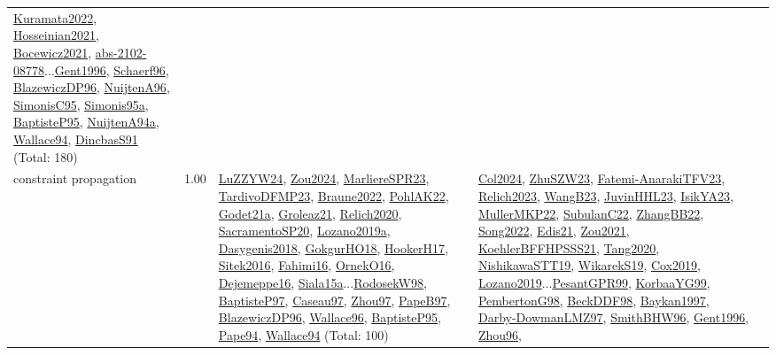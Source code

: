 {\begin{longtable}{p{3cm}r>{\raggedright\arraybackslash}p{6cm}>{\raggedright\arraybackslash}p{6cm}>{\raggedright\arraybackslash}p{8cm}}
\hyperref[detail:Kuramata2022]{Kuramata2022}, \hyperref[detail:Hosseinian2021]{Hosseinian2021}, \hyperref[detail:Bocewicz2021]{Bocewicz2021}, \hyperref[detail:abs-2102-08778]{abs-2102-08778}...\hyperref[detail:Gent1996]{Gent1996}, \hyperref[detail:Schaerf96]{Schaerf96}, \hyperref[detail:BlazewiczDP96]{BlazewiczDP96}, \hyperref[detail:NuijtenA96]{NuijtenA96}, \hyperref[detail:SimonisC95]{SimonisC95}, \hyperref[detail:Simonis95a]{Simonis95a}, \hyperref[detail:BaptisteP95]{BaptisteP95}, \hyperref[detail:NuijtenA94a]{NuijtenA94a}, \hyperref[detail:Wallace94]{Wallace94}, \hyperref[detail:DincbasS91]{DincbasS91} (Total: 180)\\
\index{constraint propagation}\index{CP!constraint propagation}constraint propagation &  1.00 & \hyperref[detail:LuZZYW24]{LuZZYW24}, \hyperref[detail:Zou2024]{Zou2024}, \hyperref[detail:MarliereSPR23]{MarliereSPR23}, \hyperref[detail:TardivoDFMP23]{TardivoDFMP23}, \hyperref[detail:Braune2022]{Braune2022}, \hyperref[detail:PohlAK22]{PohlAK22}, \hyperref[detail:Godet21a]{Godet21a}, \hyperref[detail:Groleaz21]{Groleaz21}, \hyperref[detail:Relich2020]{Relich2020}, \hyperref[detail:SacramentoSP20]{SacramentoSP20}, \hyperref[detail:Lozano2019a]{Lozano2019a}, \hyperref[detail:Dasygenis2018]{Dasygenis2018}, \hyperref[detail:GokgurHO18]{GokgurHO18}, \hyperref[detail:HookerH17]{HookerH17}, \hyperref[detail:Sitek2016]{Sitek2016}, \hyperref[detail:Fahimi16]{Fahimi16}, \hyperref[detail:OrnekO16]{OrnekO16}, \hyperref[detail:Dejemeppe16]{Dejemeppe16}, \hyperref[detail:Siala15a]{Siala15a}...\hyperref[detail:RodosekW98]{RodosekW98}, \hyperref[detail:BaptisteP97]{BaptisteP97}, \hyperref[detail:Caseau97]{Caseau97}, \hyperref[detail:Zhou97]{Zhou97}, \hyperref[detail:PapeB97]{PapeB97}, \hyperref[detail:BlazewiczDP96]{BlazewiczDP96}, \hyperref[detail:Wallace96]{Wallace96}, \hyperref[detail:BaptisteP95]{BaptisteP95}, \hyperref[detail:Pape94]{Pape94}, \hyperref[detail:Wallace94]{Wallace94} (Total: 100) & \hyperref[detail:Col2024]{Col2024}, \hyperref[detail:ZhuSZW23]{ZhuSZW23}, \hyperref[detail:Fatemi-AnarakiTFV23]{Fatemi-AnarakiTFV23}, \hyperref[detail:Relich2023]{Relich2023}, \hyperref[detail:WangB23]{WangB23}, \hyperref[detail:JuvinHHL23]{JuvinHHL23}, \hyperref[detail:IsikYA23]{IsikYA23}, \hyperref[detail:MullerMKP22]{MullerMKP22}, \hyperref[detail:SubulanC22]{SubulanC22}, \hyperref[detail:ZhangBB22]{ZhangBB22}, \hyperref[detail:Song2022]{Song2022}, \hyperref[detail:Edis21]{Edis21}, \hyperref[detail:Zou2021]{Zou2021}, \hyperref[detail:KoehlerBFFHPSSS21]{KoehlerBFFHPSSS21}, \hyperref[detail:Tang2020]{Tang2020}, \hyperref[detail:NishikawaSTT19]{NishikawaSTT19}, \hyperref[detail:WikarekS19]{WikarekS19}, \hyperref[detail:Cox2019]{Cox2019}, \hyperref[detail:Lozano2019]{Lozano2019}...\hyperref[detail:PesantGPR99]{PesantGPR99}, \hyperref[detail:KorbaaYG99]{KorbaaYG99}, \hyperref[detail:PembertonG98]{PembertonG98}, \hyperref[detail:BeckDDF98]{BeckDDF98}, \hyperref[detail:Baykan1997]{Baykan1997}, \hyperref[detail:Darby-DowmanLMZ97]{Darby-DowmanLMZ97}, \hyperref[detail:SmithBHW96]{SmithBHW96}, \hyperref[detail:Gent1996]{Gent1996}, \hyperref[detail:Zhou96]{Zhou96}, 
\end{longtable}}

